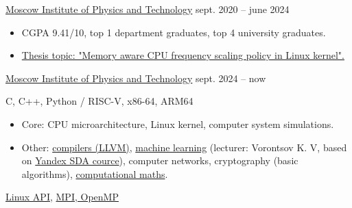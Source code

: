         {\href{https://mipt.ru}{Moscow Institute of Physics and Technology}}
        {sept. 2020 -- june 2024}{}

    \begin{itemize}
        \item CGPA 9.41/10, top 1 department graduates, top 4 university graduates.
        \item \href{https://github.com/Vokerlee/macfm-governor-thesis/blob/master/thesis/ru/thesis.pdf}
                   {Thesis topic: "Memory aware CPU frequency scaling policy in Linux kernel".}
    \end{itemize}

        {\href{https://mipt.ru}{Moscow Institute of Physics and Technology}}
        {sept. 2024 -- now}{}


    C, C++, Python / RISC-V, x86-64, ARM64
    \smallskip

    \begin{itemize}
        \item Core: CPU microarchitecture, Linux kernel, computer system simulations.
        \item Other: \href{https://github.com/Vokerlee/llvm-practice}{compilers (LLVM)},
            \href{https://github.com/Vokerlee/machine-learning-mipt}{machine learning} (lecturer: Vorontsov K. V, based on
            \href{https://dataschool.yandex.com}{Yandex SDA cource}), computer networks,
            cryptography (basic algorithms),
            \href{https://github.com/Vokerlee/computational-maths-mipt}{computational maths}.
    \end{itemize}
    \smallskip

    \href{https://github.com/Vokerlee/linux-api-course}{Linux API},
    \href{https://github.com/Vokerlee/parallel-computing-mipt}{MPI, OpenMP}
    \smallskip

